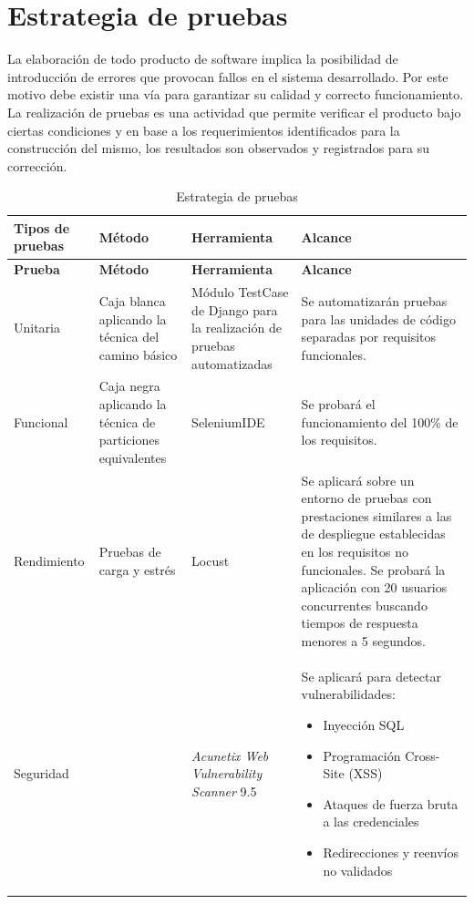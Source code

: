 \section{Estrategia de pruebas}

La elaboración de todo producto de software implica la posibilidad de introducción de errores que provocan fallos en el sistema desarrollado. Por este motivo debe existir una vía para garantizar su calidad y correcto funcionamiento. La realización de pruebas es una actividad que permite verificar el producto bajo ciertas condiciones y en base a los requerimientos identificados para la construcción del mismo, los resultados son observados y registrados para su corrección.

\begin{longtable}{|p{2.5cm}|p{3cm}|p{3cm}|p{6cm}|}
	\caption{Estrategia de pruebas} \label{tab:plan-pruebas} \\
	\hline
	\textbf{Tipos de pruebas} & \textbf{Método} & \textbf{Herramienta} & \textbf{Alcance} \\
	\hline
	\endfirsthead
	
	\hline
	\textbf{Prueba} & \textbf{Método} & \textbf{Herramienta} & \textbf{Alcance} \\
	\hline
	\endhead
	
	Unitaria & Caja blanca aplicando la técnica del camino básico & Módulo TestCase de Django para la realización de pruebas automatizadas & Se automatizarán pruebas para las unidades de código separadas por requisitos funcionales. \\
	\hline
	Funcional & Caja negra aplicando la técnica de particiones equivalentes & SeleniumIDE & Se probará el funcionamiento del 100\% de los requisitos. \\
	\hline
	Rendimiento & Pruebas de carga y estrés & Locust & Se aplicará sobre un entorno de pruebas con prestaciones similares a las de despliegue establecidas en los requisitos no funcionales. Se probará la aplicación con 20 usuarios concurrentes buscando tiempos de respuesta menores a 5 segundos. \\
	\hline
	Seguridad &  & \textit{Acunetix Web Vulnerability Scanner} 9.5 & Se aplicará para detectar vulnerabilidades:
	\begin{itemize}[left=0pt]
		\item Inyección SQL
		\item Programación Cross-Site (XSS)
		\item Ataques de fuerza bruta a las credenciales
		\item Redirecciones y reenvíos no validados
	\end{itemize} \\
	\hline
\end{longtable}

